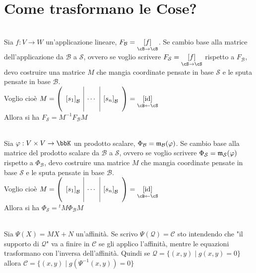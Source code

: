 \documentclass[a4paper,NoNotes,GeneralMath]{stdmdoc}
\newcommand{\mtrapp}[3]{\underset{ {{#2} \rar {#3}} }{ \left[ {#1} \right]}}
\newcommand{\revmtrapp}[3]{\underset{ {{#3} \leftarrow {#2}} }{ \left[ {#1} \right]}}
\begin{document}
	\section*{Come trasformano le Cose?}
	 \\
	Sia $f: V \rightarrow W$ un'applicazione lineare, $F_{\mathcal{B}} = \mtrapp{f}{\cB}{\cB}$. Se cambio base alla matrice dell'applicazione da $\mathcal{B}$ a $\mathcal{S}$, ovvero se voglio scrivere $F_{\mathcal{S}} = \mtrapp{f}{\cS}{\cS}$ rispetto a $F_{\mathcal{B}}$, devo costruire una matrice $M$ che mangia coordinate pensate in base $\mathcal{S}$ e le sputa pensate in base $\mathcal{B}$. \\
	Voglio cioè $M = \left( \begin{array}{c|c|c}  & & \\ {[s_1]}_{\mathcal{B}} & \cdots & {[s_n]}_{\mathcal{B}} \\  &  &  \\ \end{array} \right) = \revmtrapp{\Id}{\cS}{\cB}$ \\
	Allora si ha $F_{\mathcal{S}} = M^{-1}F_{\mathcal{B}}M$

	 \\
	Sia $\varphi: V \times V \rightarrow \bbK$ un prodotto scalare, $\Phi_{\mathcal{B}} = \mathfrak{m}_{\mathcal{B}}(\varphi)$. Se cambio base alla matrice del prodotto scalare da $\mathcal{B}$ a $\mathcal{S}$, ovvero se voglio scrivere $\Phi_{\mathcal{S}} = \mathfrak{m}_{\mathcal{S}}(\varphi)$ rispetto a $\Phi_{\mathcal{B}}$, devo costruire una matrice $M$ che mangia coordinate pensate in base $\mathcal{S}$ e le sputa pensate in base $\mathcal{B}$. \\
	Voglio cioè $M = \left( \begin{array}{c|c|c} & & \\ {[s_1]}_{\mathcal{B}} & \cdots & {[s_n]}_{\mathcal{B}} \\ & & \\ \end{array} \right) = \revmtrapp{\Id}{\cS}{\cB}$ \\
	Allora si ha $\Phi_{\mathcal{S}} = {}^tM\Phi_{\mathcal{B}}M$
	
	 \\
	Sia $\Psi(X) = MX+N$ un'affinità. Se scrivo $\Psi(\mathcal{Q}) = \mathcal{C}$ sto intendendo che "il supporto di $\mathcal{Q}$" va a finire in $\mathcal{C}$ se gli applico l'affinità, mentre le equazioni trasformano con l'inversa dell'affinità. Quindi se $\mathcal{Q} = \{(x,y) \mid g(x,y) = 0\}$ allora $\mathcal{C} = \{(x,y) \mid g(\Psi^{-1}(x,y)) = 0\}$
\end{document}
